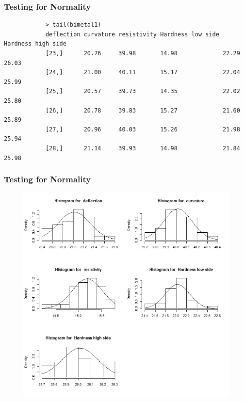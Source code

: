 \documentclass{beamer}
\begin{document}
	\begin{frame}[fragile]
		\frametitle{Testing for Normality}
\large
\begin{verbatim}
			> tail(bimetal1)
			deflection curvature resistivity Hardness low side Hardness high side
			[23,]      20.76     39.98       14.98             22.29             26.03
			[24,]      21.00     40.11       15.17             22.04             25.99
			[25,]      20.57     39.73       14.35             22.02             25.80
			[26,]      20.78     39.83       15.27             21.60             25.89
			[27,]      20.96     40.03       15.26             21.98             25.94
			[28,]      21.14     39.93       14.98             21.84             25.98
\end{verbatim}
\end{frame}

\begin{frame}[fragile]
\frametitle{Testing for Normality}
\begin{figure}[h!]
\centering
\includegraphics[width=0.8\linewidth]{images/MSQC-bimetal1hist}
\end{figure}
	\end{frame}
	
\end{document}
